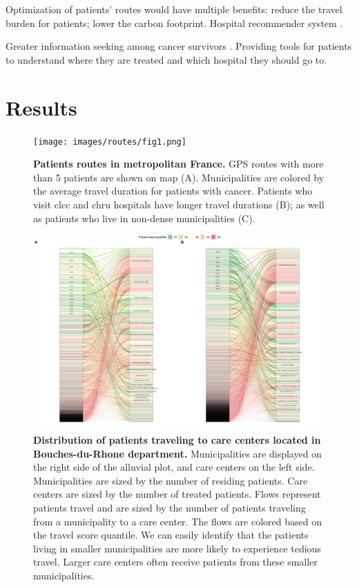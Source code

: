 Optimization of patients' routes would have multiple benefits: reduce the travel burden for patients; lower the carbon footprint.
Hospital recommender system \cite{zhang_idoctor_2017,han_hybrid_2018,narducci_recommender_2015,hoens_reliable_2010,tran_recommender_2021}.

Greater information seeking among cancer survivors \cite{finney_rutten_cancer-related_2016}. Providing tools for patients to understand where they are treated and which hospital they should go to.

\section{Results}

\begin{figure}[H]
    \texttt{[image: images/routes/fig1.png]}
    \centering
    \caption{
        \textbf{Patients routes in metropolitan France.} GPS routes with more than 5 patients are shown on map (A). Municipalities are colored by the average travel duration for patients with cancer. Patients who visit \ac{clcc} and \ac{chru} hospitals have longer travel durations (B); as well as patients who live in non-dense municipalities (C).
    }
    \label{fig:routes-duration-france}
\end{figure}

\begin{figure}[H]
    \includegraphics[width=\textwidth]{images/routes/fig6.png}
    \centering
    \caption{
        \textbf{Distribution of patients traveling to care centers located in Bouches-du-Rhone department.} Municipalities are displayed on the right side of the alluvial plot, and care centers on the left side. Municipalities are sized by the number of residing patients. Care centers are sized by the number of treated patients. Flows represent patients travel and are sized by the number of patients traveling from a municipality to a care center. The flows are colored based on the travel score quantile. We can easily identify that the patients living in smaller municipalities are more likely to experience tedious travel. Larger care centers often receive patients from these smaller municipalities.
    }
    \label{fig:routes-alluvial-13}
\end{figure}

